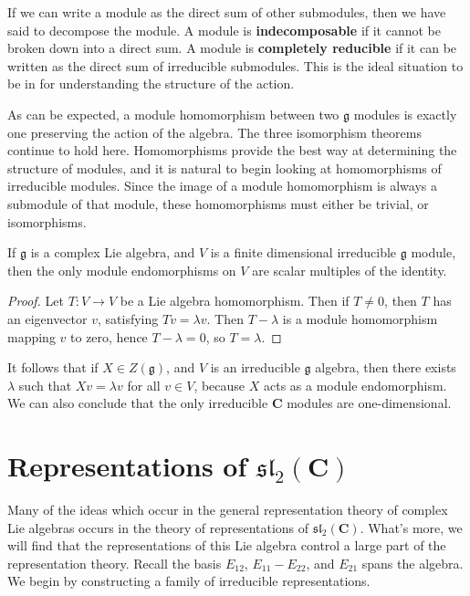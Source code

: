 If we can write a module as the direct sum of other submodules, then we have said to decompose the module. A module is {\bf indecomposable} if it cannot be broken down into a direct sum. A module is {\bf completely reducible} if it can be written as the direct sum of irreducible submodules. This is the ideal situation to be in for understanding the structure of the action.

As can be expected, a module homomorphism between two $\mathfrak{g}$ modules is exactly one preserving the action of the algebra. The three isomorphism theorems continue to hold here. Homomorphisms provide the best way at determining the structure of modules, and it is natural to begin looking at homomorphisms of irreducible modules. Since the image of a module homomorphism is always a submodule of that module, these homomorphisms must either be trivial, or isomorphisms.

\begin{lemma}[Schur]
    If $\mathfrak{g}$ is a complex Lie algebra, and $V$ is a finite dimensional irreducible $\mathfrak{g}$ module, then the only module endomorphisms on $V$ are scalar multiples of the identity.
\end{lemma}
\begin{proof}
    Let $T: V \to V$ be a Lie algebra homomorphism. Then if $T \neq 0$, then $T$ has an eigenvector $v$, satisfying $Tv = \lambda v$. Then $T - \lambda$ is a module homomorphism mapping $v$ to zero, hence $T - \lambda = 0$, so $T = \lambda$.
\end{proof}

It follows that if $X \in Z(\mathfrak{g})$, and $V$ is an irreducible $\mathfrak{g}$ algebra, then there exists $\lambda$ such that $Xv = \lambda v$ for all $v \in V$, because $X$ acts as a module endomorphism. We can also conclude that the only irreducible $\mathbf{C}$ modules are one-dimensional.




\section{Representations of $\mathfrak{sl}_2(\mathbf{C})$}

Many of the ideas which occur in the general representation theory of complex Lie algebras occurs in the theory of representations of $\mathfrak{sl}_2(\mathbf{C})$. What's more, we will find that the representations of this Lie algebra control a large part of the representation theory. Recall the basis $E_{12}$, $E_{11} - E_{22}$, and $E_{21}$ spans the algebra. We begin by constructing a family of irreducible representations.

